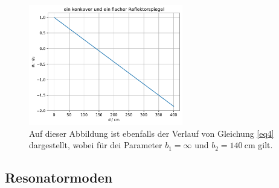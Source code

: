 \begin{figure}
    \centering
    \includegraphics[width=0.6\textwidth]{figure/dlin.pdf}
    \caption{Auf dieser Abbildung ist ebenfalls der Verlauf von Gleichung \eqref{eq4}
    dargestellt, wobei für dei Parameter $b_{1} = \infty$ und $b_{2} = \SI{140}{\centi\meter}$ 
    gilt.}
    \label{abb2}
\end{figure}

\subsection{Resonatormoden}

